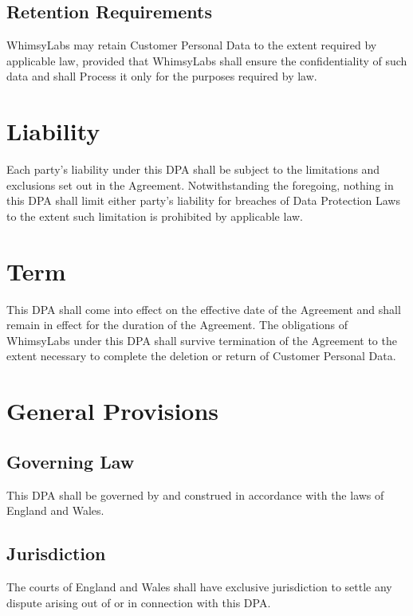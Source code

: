 \documentclass[11pt,a4paper]{article}
\begin{document}
\subsection{Retention Requirements}
WhimsyLabs may retain Customer Personal Data to the extent required by applicable law, provided that WhimsyLabs shall ensure the confidentiality of such data and shall Process it only for the purposes required by law.

\section{Liability}

Each party's liability under this DPA shall be subject to the limitations and exclusions set out in the Agreement. Notwithstanding the foregoing, nothing in this DPA shall limit either party's liability for breaches of Data Protection Laws to the extent such limitation is prohibited by applicable law.

\section{Term}

This DPA shall come into effect on the effective date of the Agreement and shall remain in effect for the duration of the Agreement. The obligations of WhimsyLabs under this DPA shall survive termination of the Agreement to the extent necessary to complete the deletion or return of Customer Personal Data.

\section{General Provisions}

\subsection{Governing Law}
This DPA shall be governed by and construed in accordance with the laws of England and Wales.

\subsection{Jurisdiction}
The courts of England and Wales shall have exclusive jurisdiction to settle any dispute arising out of or in connection with this DPA.
\end{document}
